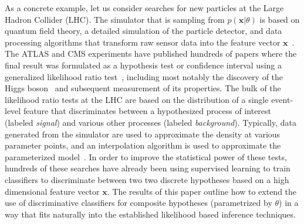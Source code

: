 \documentclass[12pt]{article}
\numberwithin{equation}{section}
\theoremstyle{plain}
\begin{document}
As a concrete example, let us consider searches for new particles at the Large
Hadron Collider (LHC). The simulator that is sampling from $p(\mathbf{x}|\theta)$ is
based on quantum field theory, a detailed simulation of the particle detector,
and data processing algorithms that transform raw sensor data into the feature
vector $\mathbf{x}$~\citep{Sjostrand:2006za,Agostinelli:2002hh}. The ATLAS and CMS
experiments have published  hundreds of papers where the final result was
formulated as a hypothesis test or confidence interval using a generalized
likelihood ratio test~\citep{Cowan:2010js}, including most notably the discovery
of the Higgs boson~\citep{Aad:2012tfa,Chatrchyan:2012ufa} and subsequent
measurement of its properties. The bulk of the likelihood ratio tests at the LHC
are based on the distribution of a single event-level feature that discriminates
between a hypothesized process of interest (labeled \textit{signal}) and various
other processes (labeled \textit{background}).
Typically, data generated from the
simulator are used to approximate the density at various parameter points, and
an interpolation algorithm is used to approximate the parameterized
model~\citep{Cranmer:2012sba}. In order to improve the statistical power
of these tests, hundreds of these searches have already been using supervised
learning to train classifiers to discriminate between two two discrete hypotheses based
on a high dimensional feature vector $\mathbf{x}$. The results of this paper outline
how to extend the use of discriminative classifiers for composite hypotheses (parametrized by $\theta$)
in a way
that fits naturally into the established likelihood based inference techniques.
\end{document}
